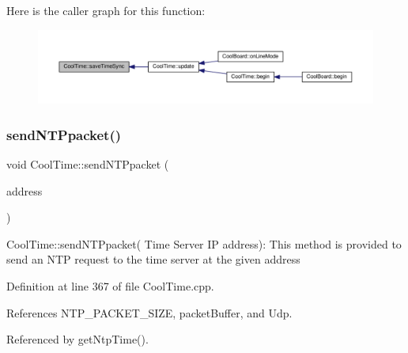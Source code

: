 Here is the caller graph for this function\+:
\nopagebreak
\begin{figure}[H]
\begin{center}
\leavevmode
\includegraphics[width=350pt]{classCoolTime_ae9658c9b377510d469e3b88edf33ee85_icgraph}
\end{center}
\end{figure}
\mbox{\label{classCoolTime_a236a38d120dc53bc67456d763838c5a1}} 
\subsubsection{\texorpdfstring{send\+N\+T\+Ppacket()}{sendNTPpacket()}}
{\footnotesize\ttfamily void Cool\+Time\+::send\+N\+T\+Ppacket (\begin{DoxyParamCaption}\item[{I\+P\+Address \&}]{address }\end{DoxyParamCaption})}

Cool\+Time\+::send\+N\+T\+Ppacket( Time Server I\+P address)\+: This method is provided to send an N\+TP request to the time server at the given address 

Definition at line 367 of file Cool\+Time.\+cpp.



References N\+T\+P\+\_\+\+P\+A\+C\+K\+E\+T\+\_\+\+S\+I\+ZE, packet\+Buffer, and Udp.



Referenced by get\+Ntp\+Time().


